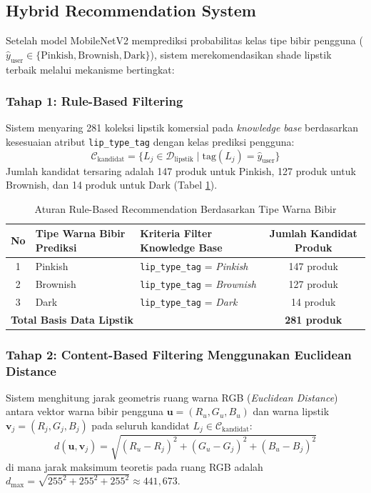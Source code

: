 \documentclass[10pt,a4paper]{article}
\begin{document}
\subsection{Hybrid Recommendation System}
Setelah model MobileNetV2 memprediksi probabilitas kelas tipe bibir pengguna ($\hat{y}_{\text{user}} \in \{\text{Pinkish}, \text{Brownish}, \text{Dark}\}$), sistem merekomendasikan shade lipstik terbaik melalui mekanisme bertingkat:

\subsubsection{Tahap 1: Rule-Based Filtering}
Sistem menyaring 281 koleksi lipstik komersial pada \textit{knowledge base} berdasarkan kesesuaian atribut \texttt{lip\_type\_tag} dengan kelas prediksi pengguna:
\begin{equation}
 \mathcal{C}_{\text{kandidat}} = \{ L_j \in \mathcal{D}_{\text{lipstik}} \mid \text{tag}(L_j) = \hat{y}_{\text{user}} \}
\end{equation}
Jumlah kandidat tersaring adalah 147 produk untuk Pinkish, 127 produk untuk Brownish, dan 14 produk untuk Dark (Tabel \ref{tab:rule_based}).

\begin{table}[htbp]
 \centering
 \caption{Aturan Rule-Based Recommendation Berdasarkan Tipe Warna Bibir}
 \label{tab:rule_based}
 \fontsize{8.5pt}{11pt}\selectfont
 \begin{tabular}{cllc}
 \toprule
 \textbf{No} & \textbf{Tipe Warna Bibir Prediksi} & \textbf{Kriteria Filter Knowledge Base} & \textbf{Jumlah Kandidat Produk} \\
 \midrule
 1 & Pinkish & \texttt{lip\_type\_tag} = \textit{Pinkish} & 147 produk \\
 2 & Brownish & \texttt{lip\_type\_tag} = \textit{Brownish} & 127 produk \\
 3 & Dark & \texttt{lip\_type\_tag} = \textit{Dark} & 14 produk \\
 \midrule
 \multicolumn{3}{l}{\textbf{Total Basis Data Lipstik}} & \textbf{281 produk} \\
 \bottomrule
 \end{tabular}
\end{table}

\subsubsection{Tahap 2: Content-Based Filtering Menggunakan Euclidean Distance}
Sistem menghitung jarak geometris ruang warna RGB (\textit{Euclidean Distance}) antara vektor warna bibir pengguna $\mathbf{u} = (R_u, G_u, B_u)$ dan warna lipstik $\mathbf{v}_j = (R_j, G_j, B_j)$ pada seluruh kandidat $L_j \in \mathcal{C}_{\text{kandidat}}$:
\begin{equation}
 d(\mathbf{u}, \mathbf{v}_j) = \sqrt{(R_u - R_j)^2 + (G_u - G_j)^2 + (B_u - B_j)^2}
 \label{eq:euclidean}
\end{equation}
di mana jarak maksimum teoretis pada ruang RGB adalah $d_{\max} = \sqrt{255^2 + 255^2 + 255^2} \approx 441{,}673$.
\end{document}
